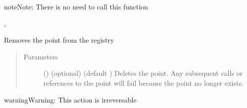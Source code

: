 \documentclass[letterpaper,10pt,english]{sphinxmanual}
\begin{document}
\begin{fulllineitems}
\begin{fulllineitems}
\begin{sphinxadmonition}{note}{Note:}
There is no need to call this function
\end{sphinxadmonition}




{\hyperref[\detokenize{pypoints:pypoints.PointRegistry}]{}}, 



\end{fulllineitems}


\begin{fulllineitems}
\label{\detokenize{pypoints:pypoints.Point.remove}}
Removes the point from the registry
\begin{quote}\begin{description}
\item[{Parameters}] \leavevmode
{} () \textendash{} (optional) (default ) Deletes the point. Any subsequent calls or references to the point will fail because the point no longer exists.

\end{description}\end{quote}

\begin{sphinxadmonition}{warning}{Warning:}
This action is irreversable
\end{sphinxadmonition}

\end{fulllineitems}


\end{fulllineitems}

\end{document}
